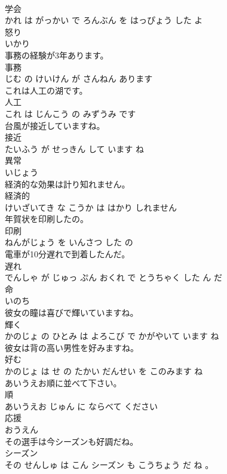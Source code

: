 \documentclass[8pt]{extreport}
\begin{document}
\begin{CJK}{UTF8}{min}
\\	学会 
\\	かれ は がっかい で ろんぶん を はっぴょう した よ			
\\	怒り	
\\	いかり		
\\	事務の経験が3年あります。	
\\	事務 
\\	じむ の けいけん が さんねん あります			
\\	これは人工の湖です。	
\\	人工 
\\	これ は じんこう の みずうみ です			
\\	台風が接近していますね。	
\\	接近 
\\	たいふう が せっきん して います ね			
\\	異常	
\\	いじょう		
\\	経済的な効果は計り知れません。	
\\	経済的 
\\	けいざいてき な こうか は はかり しれません			
\\	年賀状を印刷したの。	
\\	印刷 
\\	ねんがじょう を いんさつ した の			
\\	電車が10分遅れで到着したんだ。	
\\	遅れ 
\\	でんしゃ が じゅっ ぷん おくれ で とうちゃく した ん だ			
\\	命	
\\	いのち		
\\	彼女の瞳は喜びで輝いていますね。	
\\	輝く 
\\	かのじょ の ひとみ は よろこび で かがやいて います ね			
\\	彼女は背の高い男性を好みますね。	
\\	好む 
\\	かのじょ は せ の たかい だんせい を このみます ね			
\\	あいうえお順に並べて下さい。	
\\	順 
\\	あいうえお じゅん に ならべて ください			
\\	応援	
\\	おうえん		
\\	その選手は今シーズンも好調だね。	
\\	シーズン 
\\	その せんしゅ は こん シーズン も こうちょう だ ね 。			

\end{CJK}
\end{document}
